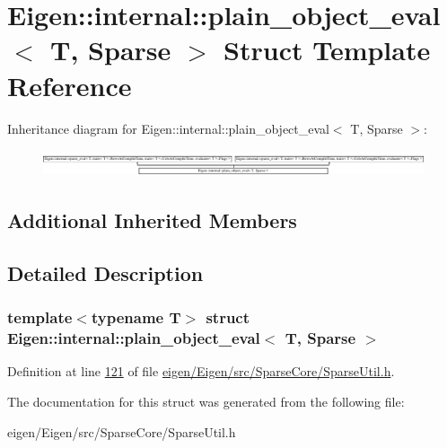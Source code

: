 \hypertarget{struct_eigen_1_1internal_1_1plain__object__eval_3_01_t_00_01_sparse_01_4}{}\section{Eigen\+:\+:internal\+:\+:plain\+\_\+object\+\_\+eval$<$ T, Sparse $>$ Struct Template Reference}
\label{struct_eigen_1_1internal_1_1plain__object__eval_3_01_t_00_01_sparse_01_4}
Inheritance diagram for Eigen\+:\+:internal\+:\+:plain\+\_\+object\+\_\+eval$<$ T, Sparse $>$\+:\begin{figure}[H]
\begin{center}
\leavevmode
\includegraphics[height=0.796586cm]{struct_eigen_1_1internal_1_1plain__object__eval_3_01_t_00_01_sparse_01_4}
\end{center}
\end{figure}
\subsection*{Additional Inherited Members}


\subsection{Detailed Description}
\subsubsection*{template$<$typename T$>$\newline
struct Eigen\+::internal\+::plain\+\_\+object\+\_\+eval$<$ T, Sparse $>$}



Definition at line \hyperlink{eigen_2_eigen_2src_2_sparse_core_2_sparse_util_8h_source_l00121}{121} of file \hyperlink{eigen_2_eigen_2src_2_sparse_core_2_sparse_util_8h_source}{eigen/\+Eigen/src/\+Sparse\+Core/\+Sparse\+Util.\+h}.



The documentation for this struct was generated from the following file\+:\begin{DoxyCompactItemize}
\item 
eigen/\+Eigen/src/\+Sparse\+Core/\+Sparse\+Util.\+h\end{DoxyCompactItemize}
